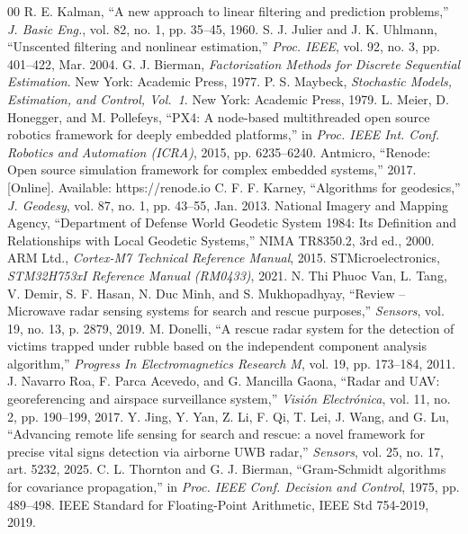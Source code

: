 \documentclass[conference]{IEEEtran}
\begin{document}
\begin{thebibliography}{00}
 R. E. Kalman, ``A new approach to linear filtering and prediction problems,'' \textit{J. Basic Eng.}, vol. 82, no. 1, pp. 35--45, 1960.
 S. J. Julier and J. K. Uhlmann, ``Unscented filtering and nonlinear estimation,'' \textit{Proc. IEEE}, vol. 92, no. 3, pp. 401--422, Mar. 2004.
 G. J. Bierman, \textit{Factorization Methods for Discrete Sequential Estimation}. New York: Academic Press, 1977.
 P. S. Maybeck, \textit{Stochastic Models, Estimation, and Control, Vol.\ 1}. New York: Academic Press, 1979.
 L. Meier, D. Honegger, and M. Pollefeys, ``PX4: A node-based multithreaded open source robotics framework for deeply embedded platforms,'' in \textit{Proc. IEEE Int. Conf. Robotics and Automation (ICRA)}, 2015, pp. 6235--6240.
 Antmicro, ``Renode: Open source simulation framework for complex embedded systems,'' 2017. [Online]. Available: https://renode.io
 C. F. F. Karney, ``Algorithms for geodesics,'' \textit{J. Geodesy}, vol. 87, no. 1, pp. 43--55, Jan. 2013.
 National Imagery and Mapping Agency, ``Department of Defense World Geodetic System 1984: Its Definition and Relationships with Local Geodetic Systems,'' NIMA TR8350.2, 3rd ed., 2000.
 ARM Ltd., \textit{Cortex-M7 Technical Reference Manual}, 2015.
 STMicroelectronics, \textit{STM32H753xI Reference Manual (RM0433)}, 2021.
 N. Thi Phuoc Van, L. Tang, V. Demir, S. F. Hasan, N. Duc Minh, and S. Mukhopadhyay, ``Review -- Microwave radar sensing systems for search and rescue purposes,'' \textit{Sensors}, vol. 19, no. 13, p. 2879, 2019.
 M. Donelli, ``A rescue radar system for the detection of victims trapped under rubble based on the independent component analysis algorithm,'' \textit{Progress In Electromagnetics Research M}, vol. 19, pp. 173--184, 2011.
 J. Navarro Roa, F. Parca Acevedo, and G. Mancilla Gaona, ``Radar and UAV: georeferencing and airspace surveillance system,'' \textit{Visi\'on Electr\'onica}, vol. 11, no. 2, pp. 190--199, 2017.
 Y. Jing, Y. Yan, Z. Li, F. Qi, T. Lei, J. Wang, and G. Lu, ``Advancing remote life sensing for search and rescue: a novel framework for precise vital signs detection via airborne UWB radar,'' \textit{Sensors}, vol. 25, no. 17, art. 5232, 2025.
 C. L. Thornton and G. J. Bierman, ``Gram-Schmidt algorithms for covariance propagation,'' in \textit{Proc. IEEE Conf. Decision and Control}, 1975, pp. 489--498.
 IEEE Standard for Floating-Point Arithmetic, IEEE Std 754-2019, 2019.

\end{thebibliography}
\end{document}
